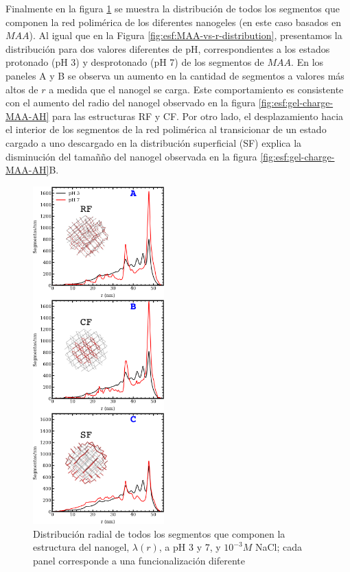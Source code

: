Finalmente en la figura \ref{fig:esf:allr-distribution} se muestra la distribuci\'on de todos los segmentos que componen la red polim\'erica de los diferentes nanogeles (en este caso basados en $MAA$). Al igual que en la Figura \ref{fig:esf:MAA-vs-r-distribution}, presentamos la distribuci\'on para dos valores diferentes de pH, correspondientes a los estados protonado (pH 3) y desprotonado (pH 7) de los segmentos de $MAA$. En los paneles A y B se observa un aumento en la cantidad de segmentos a valores m\'as altos de $r$ a medida que el nanogel se carga. Este comportamiento es consistente con el aumento del radio del nanogel observado en la figura \ref{fig:esf:gel-charge-MAA-AH} para las estructuras RF y CF. Por otro lado, el desplazamiento hacia el interior de los segmentos de la red polim\'erica al transicionar de un estado cargado a uno descargado en la distribuci\'on superficial (SF) explica la disminuci\'on del tamañ\~no del nanogel observada en la figura \ref{fig:esf:gel-charge-MAA-AH}B.

\begin{figure}[!htb]
	\centering
	\includegraphics[width=0.45\textwidth]{Figures/graphs-gel2/allseg_SI.pdf}
	\caption{Distribuci\'on radial de todos los segmentos que componen la estructura del nanogel, $\lambda(r)$, a pH 3 y 7, y $10^{-3}M$ NaCl; cada panel corresponde a una funcionalizaci\'on  diferente}
	\label{fig:esf:allr-distribution}
\end{figure}




